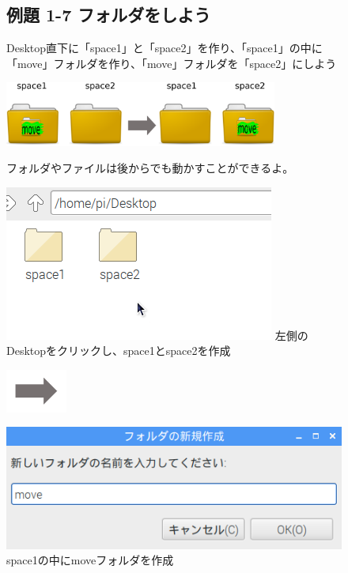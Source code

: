 \begin{figure}[htbp]
  \subsection{例題 1-7 フォルダをしよう}
  Desktop直下に「space1」と「space2」を作り、「space1」の中に「move」フォルダを作り、「move」フォルダを「space2」にしよう

  \centering
  \includegraphics[width=0.8\textwidth]{text01-img/fig15-1.eps}
  \begin{minipage}{15.297cm}
    フォルダやファイルは後からでも動かすことができるよ。
  \end{minipage}

  \begin{minipage}{0.4\textwidth}
    \includegraphics[width=\linewidth]{text01-img/textbook-img051.png}
    { 左側のDesktopをクリックし、space1とspace2を作成
    }
  \end{minipage}
  \includegraphics[width=2cm]{text01-img/textbook-img052.png}
  \begin{minipage}{0.4\textwidth}
    \includegraphics[width=\linewidth]{text01-img/textbook-img050.png}
    { space1の中にmoveフォルダを作成
    }
  \end{minipage}


\end{figure}
